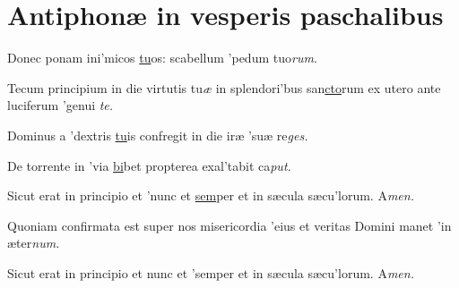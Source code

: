 \section*{Antiphonæ in vesperis paschalibus}
\par
\vskip9bp
\begin{multicols}{2}\setlength{\columnseprule}{0.2px}
Donec ponam ini'micos \underline{tu}os: \grestar{} scabellum 'pedum tuo\textit{rum}.\par
{}\par
Tecum principium in die virtutis tu\textit{æ} \gredagger{} in splendori'bus san\underline{cto}rum \grestar{} ex utero ante luciferum 'genui \textit{te.}\par
{}\par
Dominus a 'dextris \underline{tu}is \grestar{} confregit in die iræ 'suæ re\textit{ges.}\par
{}\par
De torrente in 'via \underline{bi}bet \grestar{} propterea exal'tabit ca\textit{put.}\par
{}\par
Sicut erat in principio et 'nunc et \underline{sem}per \grestar{} et in sæcula sæcu'lorum. A\textit{men.}\par
\end{multicols}\newpage
{}
\par
\vskip9bp
\begin{multicols}{2}\setlength{\columnseprule}{0.2px}
Quoniam confirmata est super nos misericordia 'eius \grestar{} et veritas Domini manet 'in æter\textit{num.}\par
{}\par
Sicut erat in principio et nunc et 'semper \grestar{} et in sæcula sæcu'lorum. A\textit{men.}\par
\end{multicols}
